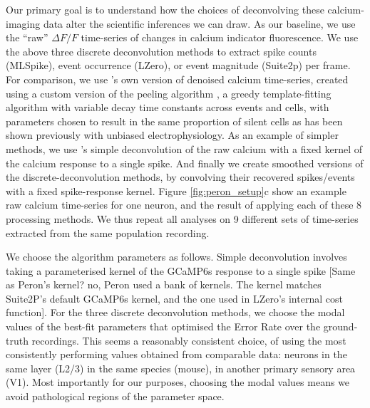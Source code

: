 \documentclass[a4paper,11pt]{article}
\begin{document}
Our primary goal is to understand how the choices of deconvolving these calcium-imaging data alter the scientific inferences we can draw.  As our baseline, we use the ``raw'' $\Delta F/F$ time-series of changes in calcium indicator fluorescence. We use the above three discrete deconvolution methods to extract spike counts (MLSpike), event occurrence (LZero), or event magnitude (Suite2p) per frame. For comparison, we use \citet{Peron2015-kd}'s own version of denoised calcium time-series, created using a custom version of the peeling algorithm \citep{Lutcke2013-wu}, a greedy template-fitting algorithm with variable decay time constants across events and cells, with parameters chosen to result in the same proportion of silent cells as has been shown previously with unbiased electrophysiology. As an example of simpler methods, we use \citet{Yaksi2006-ic}'s simple deconvolution of the raw calcium with a fixed kernel of the calcium response to a single spike. And finally we create smoothed versions of the discrete-deconvolution methods, by convolving their recovered spikes/events with a fixed spike-response kernel. Figure \ref{fig:peron_setup}c show an example raw calcium time-series for one neuron, and the result of applying each of these 8 processing methods. We thus repeat all analyses on 9 different sets of time-series extracted from the same population recording. 

We choose the algorithm parameters as follows. Simple deconvolution \citep{Yaksi2006-ic} involves taking a parameterised kernel of the GCaMP6s response to a single spike [Same as Peron’s kernel? {\color{red} no, Peron used a bank of kernels. The kernel matches Suite2P's default GCaMP6s kernel, and the one used in LZero's internal cost function}]. For the three discrete deconvolution methods, we choose the modal values of the best-fit parameters that optimised the Error Rate over the ground-truth recordings. This seems a reasonably consistent choice, of using the most consistently performing values obtained from comparable data: neurons in the same layer (L2/3) in the same species (mouse), in another primary sensory area (V1). Most importantly for our purposes, choosing the modal values means we avoid pathological regions of the parameter space.
\end{document}
